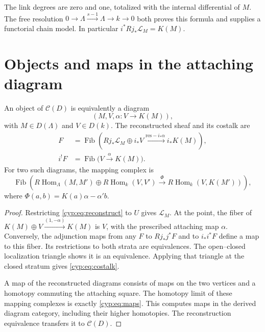 The link degrees are zero and one, totalized with the
internal differential of \(M\). The free resolution
\(0\to\Lambda\xrightarrow{s-1}\Lambda\to k\to0\)
both proves this formula and supplies a functorial chain
model. In particular \(i^*Rj_*\mathcal L_M=K(M)\).

\section{Objects and maps in the attaching diagram}

\begin{proposition}\label{cyp:prop:gluing}
An object of \(\mathcal C(D)\) is equivalently a diagram
\begin{equation}\label{cyp:eq:data}
           (M,V,\alpha:V\longrightarrow K(M)),
\end{equation}
with \(M\in D(\Lambda)\) and \(V\in D(k)\).
The reconstructed sheaf and its costalk are
\begin{align}
 F&=\operatorname{Fib}\left(
 Rj_*\mathcal L_M\oplus i_*V
 \xrightarrow{\mathrm{res}-i_*\alpha}i_*K(M)\right),
                  \label{cyp:eq:reconstruct}\\
 i^!F&=\operatorname{Fib}\bigl(V\xrightarrow{\alpha}K(M)\bigr).
                  \label{cyp:eq:costalk}
\end{align}
For two such diagrams, the mapping complex is
\begin{equation}\label{cyp:eq:maps}
 \operatorname{Fib}\left(
 R\operatorname{Hom}_{\Lambda}(M,M')\oplus
 R\operatorname{Hom}_k(V,V')
 \xrightarrow{\Phi}R\operatorname{Hom}_k(V,K(M'))\right),
\end{equation}
where \(\Phi(a,b)=K(a)\alpha-\alpha'b\).
\end{proposition}

\begin{proof}
Restricting \eqref{cyp:eq:reconstruct} to \(U\) gives
\(\mathcal L_M\). At the point, the fiber of
\(K(M)\oplus V\xrightarrow{(1,-\alpha)}K(M)\)
is \(V\), with the prescribed attaching map \(\alpha\).
Conversely, the adjunction maps from any \(F\) to
\(Rj_*j^*F\) and to \(i_*i^*F\) define a map to this
fiber. Its restrictions to both strata are equivalences.
The open--closed localization triangle shows it is an
equivalence. Applying that triangle at the closed stratum
gives \eqref{cyp:eq:costalk}.

A map of the reconstructed diagrams consists of maps on
the two vertices and a homotopy commuting the attaching
square. The homotopy limit of these mapping complexes is
exactly \eqref{cyp:eq:maps}. This computes maps in the
derived diagram category, including their higher homotopies.
The reconstruction equivalence transfers it to
\(\mathcal C(D)\).
\end{proof}

